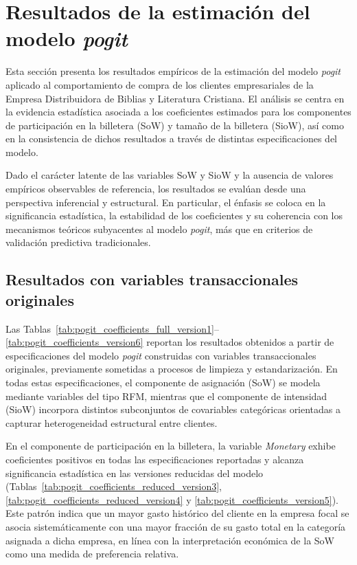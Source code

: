 \section{Resultados de la estimación del modelo \emph{pogit}}
    Esta sección presenta los resultados empíricos de la estimación del modelo \emph{pogit} aplicado al comportamiento de compra de los clientes empresariales de la Empresa Distribuidora de Biblias y Literatura Cristiana. El análisis se centra en la evidencia estadística asociada a los coeficientes estimados para los componentes de participación en la billetera (SoW) y tamaño de la billetera (SioW), así como en la consistencia de dichos resultados a través de distintas especificaciones del modelo.

    Dado el carácter latente de las variables SoW y SioW y la ausencia de valores empíricos observables de referencia, los resultados se evalúan desde una perspectiva inferencial y estructural. En particular, el énfasis se coloca en la significancia estadística, la estabilidad de los coeficientes y su coherencia con los mecanismos teóricos subyacentes al modelo \emph{pogit}, más que en criterios de validación predictiva tradicionales.

\subsection{Resultados con variables transaccionales originales}
    Las Tablas~\ref{tab:pogit_coefficients_full_version1}–\ref{tab:pogit_coefficients_version6} reportan los resultados obtenidos a partir de especificaciones del modelo \emph{pogit} construidas con variables transaccionales originales, previamente sometidas a procesos de limpieza y estandarización. En todas estas especificaciones, el componente de asignación (SoW) se modela mediante variables del tipo RFM, mientras que el componente de intensidad (SioW) incorpora distintos subconjuntos de covariables categóricas orientadas a capturar heterogeneidad estructural entre clientes.

    En el componente de participación en la billetera, la variable \textit{Monetary} exhibe coeficientes positivos en todas las especificaciones reportadas y alcanza significancia estadística en las versiones reducidas del modelo (Tablas~\ref{tab:pogit_coefficients_reduced_version3}, \ref{tab:pogit_coefficients_reduced_version4} y \ref{tab:pogit_coefficients_version5}). Este patrón indica que un mayor gasto histórico del cliente en la empresa focal se asocia sistemáticamente con una mayor fracción de su gasto total en la categoría asignada a dicha empresa, en línea con la interpretación económica de la SoW como una medida de preferencia relativa.

